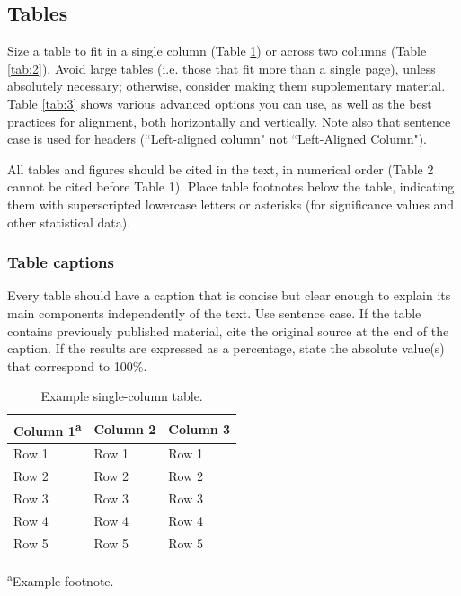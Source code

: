 \documentclass[twocolumn,twoside]{base/jrekpros}
\begin{document}
\subsection{Tables}

Size a table to fit in a single column (Table \ref{tab:1}) or across two columns (Table \ref{tab:2}). Avoid large tables (i.e. those that fit more than a single page), unless absolutely necessary; otherwise, consider making them supplementary material. Table \ref{tab:3} shows various advanced options you can use, as well as the best practices for alignment, both horizontally and vertically. Note also that sentence case is used for headers (``Left-aligned column" not ``Left-Aligned Column").

All tables and figures should be cited in the text, in numerical order (Table 2 cannot be cited before Table 1). Place table footnotes below the table, indicating them with superscripted lowercase letters or asterisks (for significance values and other statistical data).

\subsubsection{Table captions}

Every table should have a caption that is concise but clear enough to explain its main components independently of the text. Use sentence case. If the table contains previously published material, cite the original source at the end of the caption. If the results are expressed as a percentage, state the absolute value(s) that correspond to 100\%.

\begin{table}[t]
  	\centering\footnotesize\sffamily
  	\caption{Example single-column table.}
  	\begin{tableminipage}{\linewidth}
    	\begin{tabularx} {\linewidth}{XXX}
			\toprule
            Column 1\textsuperscript{a} & Column 2 & Column 3  \\            
	    	\midrule
            Row 1 & Row 1 & Row 1 \\
            Row 2 & Row 2 & Row 2 \\
            Row 3 & Row 3 & Row 3 \\
            Row 4 & Row 4 & Row 4 \\
            Row 5 & Row 5 & Row 5 \\
            \bottomrule
    	\end{tabularx}
        \label{tab:1}
        \vskip0pt
        \textsuperscript{a}Example footnote.
  	\end{tableminipage}
\end{table}
\end{document}
